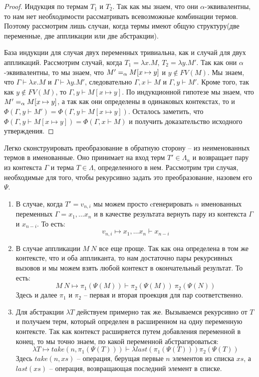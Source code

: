 \begin{proof}
  Индукция по термам $T_{1}$ и $T_{2}$. Так как мы знаем, что они $\alpha$-эквивалентны, то нам нет необходимости рассматривать всевозможные комбинации термов. Поэтому рассмотрим лишь случаи, когда термы имеют общую структуру(две переменные, две аппликации или две абстракции).

  База индукции для случая двух переменных тривиальна, как и случай для двух аппликаций. Рассмотрим случай, когда $T_{1} = \lambda x.M$, $T_{2} = \lambda y.M'$. Так как они $\alpha$-эквивалентны, то мы знаем, что $M' =_{\alpha} M[x \mapsto y]$ и $y \notin FV(M)$. Мы знаем, что $\Gamma \vdash \lambda x.M$ и $\Gamma \vdash \lambda y.M'$, следовательно $\Gamma, x \vdash M$ и $\Gamma, y \vdash M'$. Кроме того, так как $y \notin FV(M)$, то $\Gamma, y \vdash M[x \mapsto y]$. По индукционной гипотезе мы знаем, что $M' =_{\alpha} M[x \mapsto y]$, а так как они определены в одинаковых контекстах, то и $\Phi(\Gamma, y \vdash M') = \Phi(\Gamma, y \vdash M[x \mapsto y])$. Осталось заметить, что $\Phi(\Gamma, y \vdash M[x \mapsto y]) = \Phi(\Gamma, x \vdash M)$ и получить доказательство исходного утверждения.
\end{proof}

Легко сконструировать преобразование в обратную сторону -- из неименованных термов в именованные. Оно принимает на вход терм $T' \in \Lambda_{n}$ и возвращает пару из контекста $\Gamma$ и терма $T \in \Lambda$, определенного в нем. Рассмотрим три случая, необходимые для того, чтобы рекурсивно задать это преобразование, назовем его $\Psi$.

\begin{enumerate}
  \item В случае, когда $T' = v_{n, i}$ мы можем просто cгенерировать $n$ именованных переменных $\Gamma = x_{1}, \dots x_{n}$ и в качестве результата вернуть пару из контекста $\Gamma$ и $x_{n - i}$. То есть:
  $$ v_{n, i} \mapsto x_{1}, \dots x_{n} \vdash x_{n-i} $$

  \item В случае аппликации $M\ N$ все еще проще. Так как она определена в том же контексте, что и оба аппликанта, то нам достаточно пары рекурсивных вызовов и мы можем взять любой контекст в окончательный результат. То есть:
  $$ M\ N \mapsto \pi_{1}(\Psi(M)) \vdash \pi_{2}(\Psi(M))\ \pi_{2}(\Psi(N))$$
  Здесь и далее $\pi_{1}$ и $\pi_{2}$ -- первая и вторая проекция для пар соответственно.

  \item Для абстракции $\lambda T$ действуем примерно так же. Вызываемся рекурсивно от $T$ и получаем терм, который определен в расширенном на одну переменную контексте. Так как контекст расширяется путем добавления переменной в конец, то мы точно знаем, по какой переменной абстрагироваться:
  $$ \lambda T \mapsto take(n, \pi_{1}(\Psi(T))) \vdash \lambda last(\pi_{1}(\Psi(T))) \pi_{2}(\Psi(T)) $$
  Здесь $take(n, xs)$ -- операция, берущая первые $n$ элементов из списка $xs$, а $last(xs)$ -- операция, возвращающая последний элемент в списке.
\end{enumerate}

